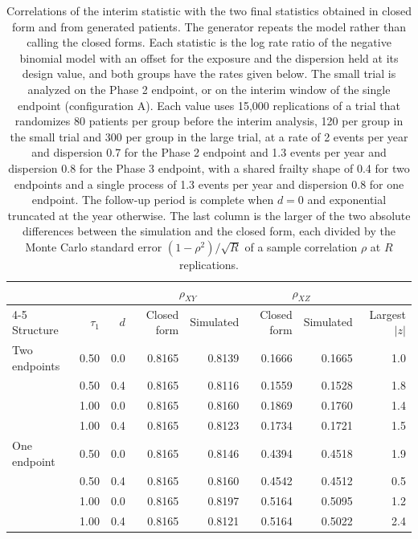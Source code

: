 \begin{table}[htbp]
\centering
\caption{Correlations of the interim statistic with the two final statistics obtained in closed form and from generated patients. The generator repeats the model rather than calling the closed forms. Each statistic is the log rate ratio of the negative binomial model with an offset for the exposure and the dispersion held at its design value, and both groups have the rates given below. The small trial is analyzed on the Phase 2 endpoint, or on the interim window of the single endpoint (configuration A). Each value uses 15,000 replications of a trial that randomizes 80 patients per group before the interim analysis, 120 per group in the small trial and 300 per group in the large trial, at a rate of 2 events per year and dispersion 0.7 for the Phase 2 endpoint and 1.3 events per year and dispersion 0.8 for the Phase 3 endpoint, with a shared frailty shape of 0.4 for two endpoints and a single process of 1.3 events per year and dispersion 0.8 for one endpoint. The follow-up period is complete when $d = 0$ and exponential truncated at the year otherwise. The last column is the larger of the two absolute differences between the simulation and the closed form, each divided by the Monte Carlo standard error $(1 - \rho^2) / \sqrt{R}$ of a sample correlation $\rho$ at $R$ replications.}
\label{tab:check}
\vspace{0.6em}
\footnotesize
\setlength{\tabcolsep}{3pt}
\begin{tabular}{lrrrrrrr}
\hline
 &  &  & \multicolumn{2}{c}{$\rho_{XY}$} & \multicolumn{2}{c}{$\rho_{XZ}$} &  \\
\cline{4-5}\cline{6-7}
Structure & $\tau_1$ & $d$ & Closed form & Simulated & Closed form & Simulated & Largest $|z|$ \\
\hline
Two endpoints & 0.50 & 0.0 & 0.8165 & 0.8139 & 0.1666 & 0.1665 & 1.0 \\
 & 0.50 & 0.4 & 0.8165 & 0.8116 & 0.1559 & 0.1528 & 1.8 \\
 & 1.00 & 0.0 & 0.8165 & 0.8160 & 0.1869 & 0.1760 & 1.4 \\
 & 1.00 & 0.4 & 0.8165 & 0.8123 & 0.1734 & 0.1721 & 1.5 \\
One endpoint & 0.50 & 0.0 & 0.8165 & 0.8146 & 0.4394 & 0.4518 & 1.9 \\
 & 0.50 & 0.4 & 0.8165 & 0.8160 & 0.4542 & 0.4512 & 0.5 \\
 & 1.00 & 0.0 & 0.8165 & 0.8197 & 0.5164 & 0.5095 & 1.2 \\
 & 1.00 & 0.4 & 0.8165 & 0.8121 & 0.5164 & 0.5022 & 2.4 \\
\hline
\end{tabular}
\end{table}
